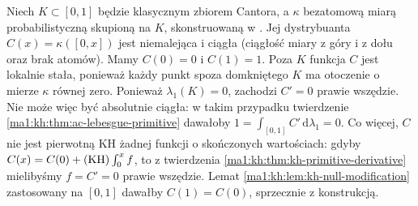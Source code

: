 \begin{przyklad}
Niech $K\subset[0,1]$ będzie klasycznym zbiorem
Cantora, a $\kappa$ bezatomową miarą probabilistyczną
skupioną na $K$, skonstruowaną w
.
Jej dystrybuanta $C(x)=\kappa([0,x])$ jest niemalejąca
i ciągła (ciągłość miary z góry i z dołu oraz brak atomów).
Mamy $C(0)=0$ i $C(1)=1$. Poza $K$ funkcja $C$ jest
lokalnie stała, ponieważ każdy punkt spoza domkniętego
$K$ ma otoczenie o mierze $\kappa$ równej zero.
Ponieważ $\lambda_1(K)=0$, zachodzi $C'=0$ prawie wszędzie.
Nie może więc być absolutnie ciągła: w takim przypadku
twierdzenie \ref{ma1:kh:thm:ac-lebesgue-primitive}
dawałoby $1=\int_{[0,1]} C'\,\mathrm d\lambda_1=0$.
Co więcej, $C$ nie jest pierwotną KH żadnej funkcji
o skończonych wartościach: gdyby
$C(x)=C(0)+(\mathrm{KH})\int_0^x f$, to z twierdzenia
\ref{ma1:kh:thm:kh-primitive-derivative} mielibyśmy
$f=C'=0$ prawie wszędzie. Lemat
\ref{ma1:kh:lem:kh-null-modification} zastosowany na
$[0,1]$ dawałby $C(1)=C(0)$, sprzecznie z konstrukcją.
\end{przyklad}
